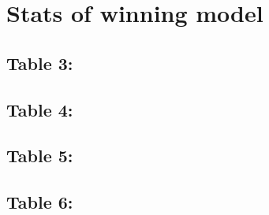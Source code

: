 \documentclass[10pt]{article}
\numberwithin{equation}{subsection}
\begin{document}
\section{Stats of winning model}

\begin{comment}
\subsection{Clustering }
\begin{figure}[htb!]
\centering
\texttt{[image: bestmodel\_by\_subj.pdf]}
\label{fig:clustresults}
\end{figure}
\end{comment}

\subsection{Table 3:}

\pagebreak
\subsection{Table 4:}


\subsection{Table 5:}

\pagebreak
\subsection{Table 6:}


\begin{comment}
\subsection{Clustering }
\begin{figure}[htb!]
\centering
\texttt{[image: parclust.pdf]}
\caption{Clustering solution on model parameters omega and theta. The red cluster includes subjects with lower impulsivity, and the blue cluster consists of subjects with higher impulsivity. Yellow squares indicate BIS levels below 73 and green squares, above. Contour lines represent one standard deviation.}
\label{fig:clustresults}
\end{figure}
\end{comment}
\end{document}
